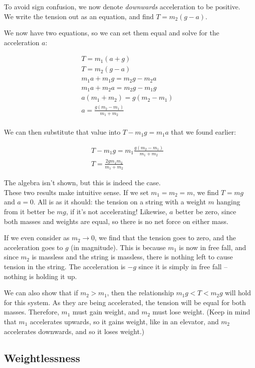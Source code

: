 To avoid sign confusion, we now denote \emph{downwards} acceleration to be positive. We write the tension out as an equation, and find $T = m_2 (g - a)$.

We now have two equations, so we can set them equal and solve for the acceleration $a$:

\begin{align}
T = m_1(a + g)\\
T = m_2(g - a)\\
m_1 a + m_1 g = m_2 g - m_2 a\\
m_1 a + m_2 a = m_2 g - m_1 g\\
a(m_1 + m_2) = g(m_2 - m_1)\\
a = \frac{g(m_2 - m_1)}{m_1 + m_2}\\
\end{align}

We can then substitute that value into $T - m_1 g = m_1 a$ that we found earlier:

\begin{align}
T - m_1 g = m_1  \frac{g(m_2 - m_1)}{m_1 + m_2}\\
T = \frac{2 g m_1 m_2}{m_1 + m_2}
\end{align}

The algebra isn't shown, but this is indeed the case.\\
These two results make intuitive sense. If we set $m_1 = m_2 = m$, we find $T = m g$ and $a = 0$. All is as it should: the tension on a string with a weight $m$ hanging from it better be $m g$, if it's not accelerating! Likewise, $a$ better be zero, since both masses and weights are equal, so there is no net force on either mass.

If we even consider as $m_2 \to 0$, we find that the tension goes to zero, and the acceleration goes to $g$ (in magnitude). This is because $m_1$ is now in free fall, and since $m_2$ is massless and the string is massless, there is nothing left to cause tension in the string. The acceleration is $-g$ since it is simply in free fall -- nothing is holding it up.

We can also show that if $m_2 > m_1$, then the relationship $m_1 g < T < m_2 g$ will hold for this system. As they are being accelerated, the tension will be equal for both masses. Therefore, $m_1$ must gain weight, and $m_2$ must lose weight. (Keep in mind that $m_1$ accelerates upwards, so it gains weight, like in an elevator, and $m_2$ accelerates downwards, and so it loses weight.)

\subsection{Weightlessness}

